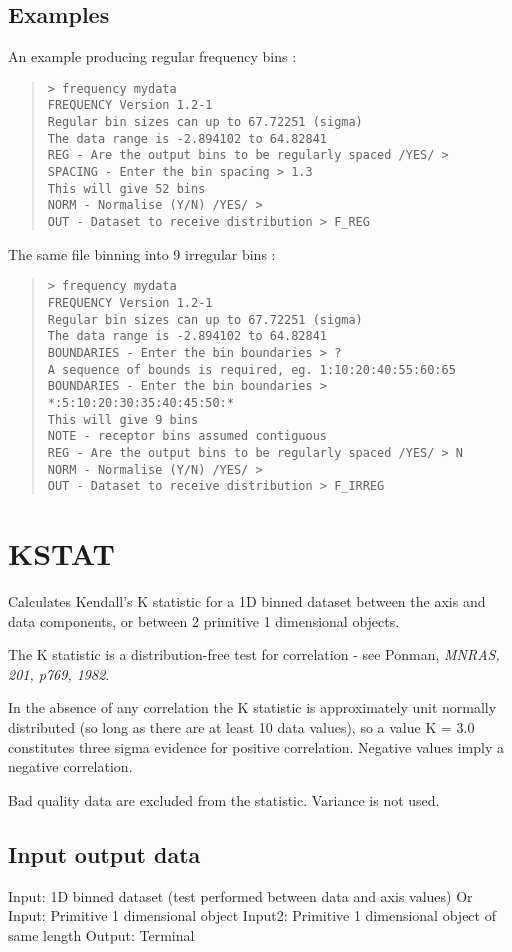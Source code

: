 \documentclass{book}
\renewcommand{\_}{{\tt\char'137}}     %
\begin{document}
\subsection{Examples}
An example producing regular frequency bins :
\begin{quote}\begin{verbatim}
> frequency mydata
FREQUENCY Version 1.2-1
Regular bin sizes can up to 67.72251 (sigma)
The data range is -2.894102 to 64.82841
REG - Are the output bins to be regularly spaced /YES/ >
SPACING - Enter the bin spacing > 1.3
This will give 52 bins
NORM - Normalise (Y/N) /YES/ >
OUT - Dataset to receive distribution > F_REG
\end{verbatim}\end{quote}
The same file binning into 9 irregular bins :
\begin{quote}\begin{verbatim}
> frequency mydata
FREQUENCY Version 1.2-1
Regular bin sizes can up to 67.72251 (sigma)
The data range is -2.894102 to 64.82841
BOUNDARIES - Enter the bin boundaries > ?
A sequence of bounds is required, eg. 1:10:20:40:55:60:65
BOUNDARIES - Enter the bin boundaries > *:5:10:20:30:35:40:45:50:*
This will give 9 bins
NOTE - receptor bins assumed contiguous
REG - Are the output bins to be regularly spaced /YES/ > N
NORM - Normalise (Y/N) /YES/ >
OUT - Dataset to receive distribution > F_IRREG
\end{verbatim}\end{quote}
\section{KSTAT}
Calculates Kendall's K statistic for a 1D binned dataset between
the axis and data components, or between 2 primitive 1 dimensional
objects.
 
The K statistic is a distribution-free test for correlation - see
Ponman, {\em MNRAS, 201, p769, 1982}.
 
In the absence of any correlation the K statistic is
approximately unit normally distributed (so long as there are at
least 10 data values), so a value K = 3.0 constitutes three sigma
evidence for positive correlation. Negative values imply a
negative correlation.
 
Bad quality data are excluded from the statistic. Variance is not
used.
 
\subsection{Input output data}
Input: 1D binned dataset (test performed between data and
axis values)
Or
Input: Primitive 1 dimensional object
Input2: Primitive 1 dimensional object of same length
Output: Terminal
\end{document}
